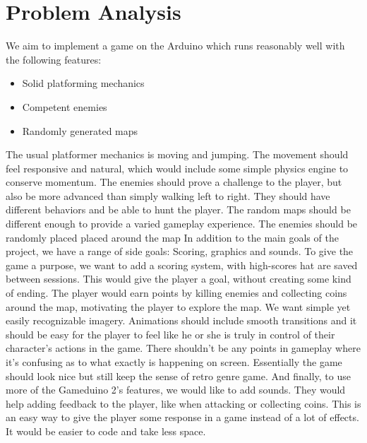 \chapter{Problem Analysis}
We aim to implement a game on the Arduino which runs reasonably well with the following features:
\begin{itemize}
\item Solid platforming mechanics
\item Competent enemies
\item Randomly generated maps
\end{itemize}
The usual platformer mechanics is moving and jumping. The movement should feel responsive and natural, which would include some simple physics engine to conserve momentum. The enemies should prove a challenge to the player, but also be more advanced than simply walking left to right. They should have different behaviors and be able to hunt the player. The random maps should be different enough to provide a varied gameplay experience. The enemies should be randomly placed placed around the map
\newline
In addition to the main goals of the project, we have a range of side goals: Scoring, graphics and sounds.
\newline
To give the game a purpose, we want to add a scoring system, with high-scores hat are saved between sessions. This would give the player a goal, without creating some kind of ending. The player would earn points by killing enemies and collecting coins around the map, motivating the player to explore the map.
\newline
We want simple yet easily recognizable imagery. Animations should include smooth transitions and it should be easy for the player to feel like he or she is truly in control of their character's actions in the game. There shouldn't be any points in gameplay where it's confusing as to what exactly is happening on screen. Essentially the game should look nice but still keep the sense of retro genre game.
\newline
And finally, to use more of the Gameduino 2's features, we would like to add sounds. They would help adding feedback to the player, like when attacking or collecting coins. This is an easy way to give the player some response in a game instead of a lot of effects. It would be easier to code and take less space.